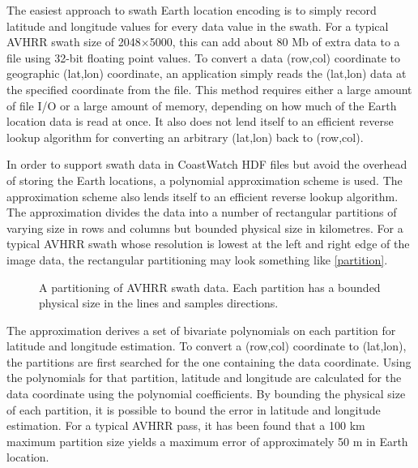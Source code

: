 The easiest approach to swath Earth location encoding is to simply
record latitude and longitude values for every data value in the
swath. For a typical AVHRR swath size of 2048$\times$5000, this can
add about 80 Mb of extra data to a file using 32-bit floating point
values. To convert a data (row,col) coordinate to geographic (lat,lon)
coordinate, an application simply reads the (lat,lon) data at the
specified coordinate from the file. This method requires either a
large amount of file I/O or a large amount of memory, depending on how
much of the Earth location data is read at once. It also does not lend
itself to an efficient reverse lookup algorithm for converting an
arbitrary (lat,lon) back to (row,col).

In order to support swath data in CoastWatch HDF files but avoid the
overhead of storing the Earth locations, a polynomial approximation
scheme is used. The approximation scheme also lends itself to an
efficient reverse lookup algorithm. The approximation divides the data
into a number of rectangular partitions of varying size in rows and
columns but bounded physical size in kilometres. For a typical AVHRR
swath whose resolution is lowest at the left and right edge of the
image data, the rectangular partitioning may look something like
\autoref{partition}.

\begin{figure}
  \begin{center}
    \caption[A partitioning of AVHRR swath data]{
      A partitioning of AVHRR swath data.  Each partition has a bounded
      physical size in the lines and samples directions.
    }
    \label{partition}
  \end{center}
\end{figure}

The approximation derives a set of bivariate polynomials on each
partition for latitude and longitude estimation. To convert a
(row,col) coordinate to (lat,lon), the partitions are first searched
for the one containing the data coordinate. Using the polynomials for
that partition, latitude and longitude are calculated for the data
coordinate using the polynomial coefficients. By bounding the physical
size of each partition, it is possible to bound the error in latitude
and longitude estimation. For a typical AVHRR pass, it has been found
that a 100 km maximum partition size yields a maximum error of
approximately 50 m in Earth location.

